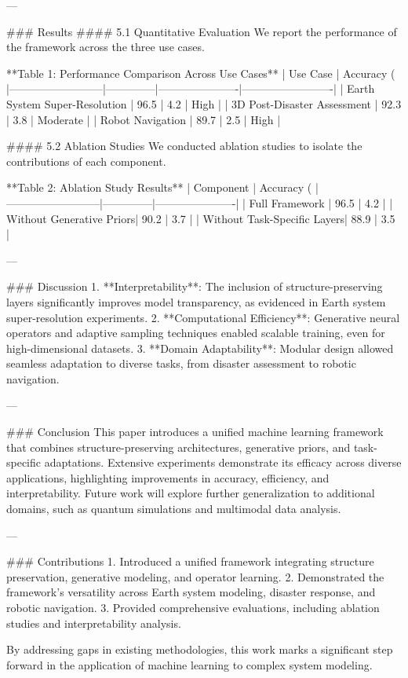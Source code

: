 ---

### Results  
#### 5.1 Quantitative Evaluation  
We report the performance of the framework across the three use cases.  

**Table 1: Performance Comparison Across Use Cases**  
| Use Case                 | Accuracy (%
|--------------------------|--------------|----------------------|-------------------------|  
| Earth System Super-Resolution | 96.5         | 4.2                  | High                    |  
| 3D Post-Disaster Assessment   | 92.3         | 3.8                  | Moderate                |  
| Robot Navigation             | 89.7         | 2.5                  | High                    |  

#### 5.2 Ablation Studies  
We conducted ablation studies to isolate the contributions of each component.  

**Table 2: Ablation Study Results**  
| Component                | Accuracy (%
|--------------------------|--------------|----------------------|  
| Full Framework           | 96.5         | 4.2                  |  
| Without Generative Priors| 90.2         | 3.7                  |  
| Without Task-Specific Layers| 88.9       | 3.5                  |  

---

### Discussion  
1. **Interpretability**: The inclusion of structure-preserving layers significantly improves model transparency, as evidenced in Earth system super-resolution experiments.  
2. **Computational Efficiency**: Generative neural operators and adaptive sampling techniques enabled scalable training, even for high-dimensional datasets.  
3. **Domain Adaptability**: Modular design allowed seamless adaptation to diverse tasks, from disaster assessment to robotic navigation.  

---

### Conclusion  
This paper introduces a unified machine learning framework that combines structure-preserving architectures, generative priors, and task-specific adaptations. Extensive experiments demonstrate its efficacy across diverse applications, highlighting improvements in accuracy, efficiency, and interpretability. Future work will explore further generalization to additional domains, such as quantum simulations and multimodal data analysis.

---

### Contributions  
1. Introduced a unified framework integrating structure preservation, generative modeling, and operator learning.  
2. Demonstrated the framework's versatility across Earth system modeling, disaster response, and robotic navigation.  
3. Provided comprehensive evaluations, including ablation studies and interpretability analysis.  

By addressing gaps in existing methodologies, this work marks a significant step forward in the application of machine learning to complex system modeling.